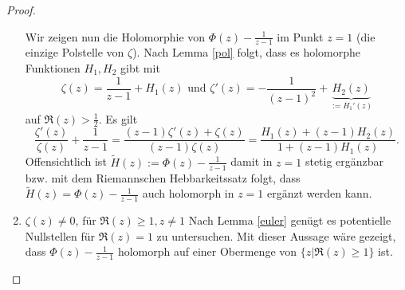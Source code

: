 \documentclass{mywork}
\begin{document}
\begin{proof}
\begin{enumerate}[1)]
Wir zeigen nun die Holomorphie von $ \Phi(z)-\frac{1}{z-1} $ im Punkt $ z=1 $ (die einzige Polstelle von $ \zeta $). Nach Lemma \ref{pol} folgt, dass es holomorphe Funktionen $ H_1, H_2 $ gibt mit 
\[
\zeta(z)=\frac{1}{z-1}+ H_1(z) \text{ und } \zeta'(z)=- \frac{1}{(z-1)^2}+ \underbrace{H_2(z)}_{:=H_1'(z)}
\]
auf $ \Re(z)>\frac{1}{2} $. Es gilt
\[
\frac{\zeta'(z)}{\zeta(z)}+ \frac{1}{z-1}= \frac{(z-1) \zeta'(z)+\zeta(z)}{(z-1)\zeta(z)}= \frac{H_1(z)+(z-1)H_2(z)}{1+(z-1) H_1(z)}.
\]
Offensichtlich ist $\tilde H(z):= \Phi(z) - \frac{1}{z-1} $ damit in $ z=1 $ stetig ergänzbar bzw. mit dem Riemannschen Hebbarkeitssatz folgt, dass $ \tilde H(z)= \Phi(z) - \frac{1}{z-1} $ auch holomorph in $ z=1 $ ergänzt werden kann.
\item $ \zeta(z)\neq 0 $, für $ \Re(z)\ge 1, z\neq 1 $
Nach Lemma \ref{euler} genügt es potentielle Nullstellen für $ \Re(z)=1 $ zu untersuchen.
Mit dieser Aussage wäre gezeigt, dass $ \Phi(z)-\frac{1}{z-1} $ holomorph auf einer Obermenge von $ \{z| \Re(z) \ge 1\} $ ist.


\end{enumerate}
\end{proof}
\end{document}
